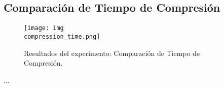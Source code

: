 \subsection{Comparación de Tiempo de Compresión}
\label{exp:compression-time}

\begin{figure}[H]
    \centering
    \texttt{[image: img\\compression\_time.png]}
    \caption{Resultados del experimento: Comparación de Tiempo de Compresión.}
    \label{fig:compression-time}
\end{figure}

...
